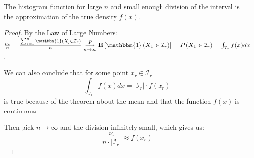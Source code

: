 \begin{remark}
  The histogram function for large $n$ and small enough division of the
  interval is the approximation of the true density $f(x)$.
\end{remark}
\begin{proof}
  By the Law of Large Numbers:
  $\frac{\nu_r}{n} = \frac{\sum_{j=1}^{n} \mathbbm{1} (X_j \in \mathcal{I}_r)}{n}
  \underset{n\to \infty}{\overset{P}{\longrightarrow}}
  \mathbf{E} \left[ \mathbbm{1} \left( X_1 \in \mathcal{I}_r \right) \right]
  = P\left( X_1 \in \mathcal{I}_r \right) = \int_{\mathcal{I}_r} f(x) dx$.

  We can also conclude that for some point $x_r \in  \mathcal{I}_r$
  \[ \int_{\mathcal{I}_r} f(x) dx = |\mathcal{I}_r| \cdot f(x_r) \] 
  is true because of the theorem about the mean
  and that the function $f(x)$ is continuous.
  
  Then pick $n \to \infty$ and the division infinitely small, which gives us:
  \[ \frac{\nu_r}{n \cdot |\mathcal{I}_r|} \approx f(x_r) \] 
\end{proof}


